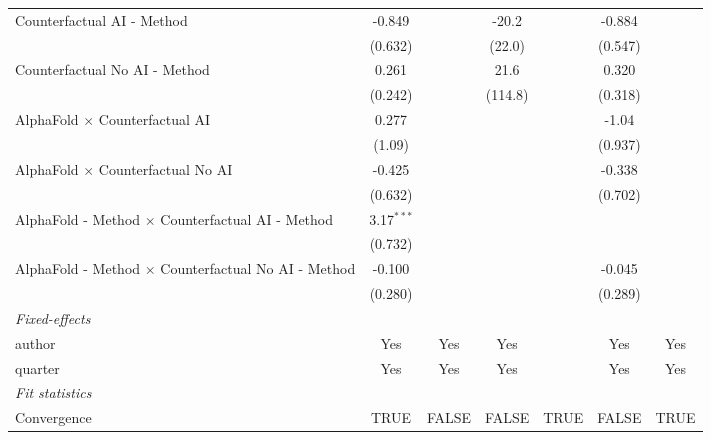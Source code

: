 \begin{tabular}{lcccccc}
   Counterfactual AI - Method                                 & -0.849       &         & -20.2         &      & -0.884  &   \\   
                                                              & (0.632)      &         & (22.0)        &      & (0.547) &   \\   
   Counterfactual No AI - Method                              & 0.261        &         & 21.6          &      & 0.320   &   \\   
                                                              & (0.242)      &         & (114.8)       &      & (0.318) &   \\   
   AlphaFold $\times$ Counterfactual AI                       & 0.277        &         &               &      & -1.04   &   \\   
                                                              & (1.09)       &         &               &      & (0.937) &   \\   
   AlphaFold $\times$ Counterfactual No AI                    & -0.425       &         &               &      & -0.338  &   \\   
                                                              & (0.632)      &         &               &      & (0.702) &   \\   
   AlphaFold - Method $\times$ Counterfactual AI - Method     & 3.17$^{***}$ &         &               &      &         &   \\   
                                                              & (0.732)      &         &               &      &         &   \\   
   AlphaFold - Method $\times$ Counterfactual No AI - Method  & -0.100       &         &               &      & -0.045  &   \\   
                                                              & (0.280)      &         &               &      & (0.289) &   \\   
   \midrule
   \emph{Fixed-effects}\\
   author                                                     & Yes          & Yes     & Yes           &      & Yes     & Yes\\  
   quarter                                                    & Yes          & Yes     & Yes           &      & Yes     & Yes\\  
   \midrule
   \emph{Fit statistics}\\
   Convergence                                                &TRUE          & FALSE   & FALSE         & TRUE & FALSE   & TRUE\\  

\end{tabular}
